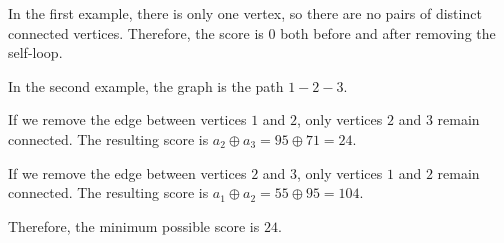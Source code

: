 In the first example, there is only one vertex, so there are no pairs of distinct connected vertices. Therefore, the score is $0$ both before and after removing the self-loop.

In the second example, the graph is the path $1 - 2 - 3.$

If we remove the edge between vertices $1$ and $2$, only vertices $2$ and $3$ remain connected. The resulting score is $a_2 \oplus a_3 = 95 \oplus 71 = 24.$

If we remove the edge between vertices $2$ and $3$, only vertices $1$ and $2$ remain connected. The resulting score is $a_1 \oplus a_2 = 55 \oplus 95 = 104.$

Therefore, the minimum possible score is $24$.
